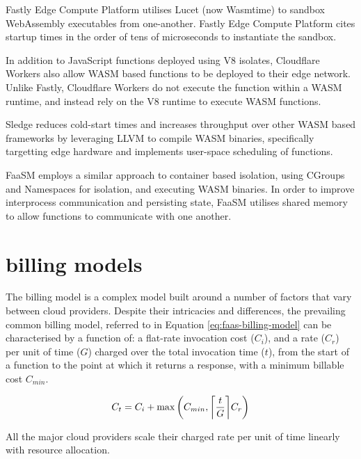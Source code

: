 Fastly Edge Compute Platform\cite{EdgeCloudPlatform} utilises Lucet\cite{BytecodeallianceLucet2024} (now Wasmtime\cite{Wasmtime}) to sandbox WebAssembly executables from one-another. Fastly Edge Compute Platform cites startup times in the order of tens of microseconds to instantiate the sandbox.

In addition to JavaScript functions deployed using V8 isolates, Cloudflare Workers\cite{CloudComputingContainers2018} also allow WASM based functions to be deployed to their edge network. Unlike Fastly, Cloudflare Workers do not execute the function within a WASM runtime, and instead rely on the V8 runtime to execute WASM functions\cite{WebAssemblyWasmCloudflare2024}.

Sledge reduces cold-start times and increases throughput over other WASM based \faas{} frameworks by leveraging LLVM to compile WASM binaries, specifically targetting edge hardware and implements user-space scheduling of functions\cite{gadepalliSledgeServerlessfirstLightweight2020}.

FaaSM employs a similar approach to container based isolation, using CGroups and Namespaces for isolation, and executing WASM binaries. In order to improve interprocess communication and persisting state, FaaSM utilises shared memory to allow functions to communicate with one another\cite{shillakerFaasmLightweightIsolation2020}.

\section{\faas{} billing models}
\label{sec:faas-billing-models}

The \faas{} billing model is a complex model built around a number of factors that vary between cloud providers. Despite their intricacies and differences, the prevailing common billing model, referred to in Equation \ref{eq:faas-billing-model} can be characterised by a function of: a flat-rate invocation cost ($C_i$), and a rate ($C_r$) per unit of time ($G$) charged over the total invocation time ($t$), from the start of a function to the point at which it returns a response, with a minimum billable cost $C_{min}$.

\begin{equation} \label{eq:faas-billing-model}
C_t = C_i + \max\left(C_{min},\ceil*{\frac{t}{G}} C_r\right)
\end{equation}

All the major cloud providers scale their charged rate per unit of time linearly with resource allocation.

